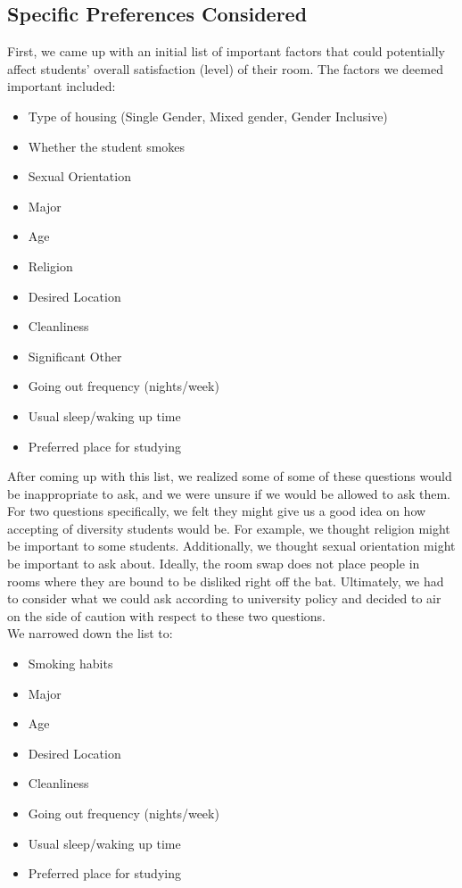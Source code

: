 \documentclass[12pt]{article}
\begin{document}
\subsection{Specific Preferences Considered}
First, we came up with an initial list of important factors that could potentially affect students' overall satisfaction (level) of their room. The factors we deemed important included: 
\begin{itemize}[noitemsep]

\item Type of housing (Single Gender, Mixed gender, Gender Inclusive)
\item Whether the student smokes
\item Sexual Orientation
\item Major 
\item Age
\item Religion
\item Desired Location
\item Cleanliness
\item Significant Other
\item Going out frequency (nights/week)
\item Usual sleep/waking up time
\item Preferred place for studying
\end{itemize}
After coming up with this list, we realized some of some of these questions would be inappropriate to ask, and we were unsure if we would be allowed to ask them. For two questions specifically, we felt they might give us a good idea on how accepting of diversity students would be. For example, we thought religion might be important to some students. Additionally, we thought sexual orientation might be important to ask about. Ideally, the room swap does not place people in rooms where they are bound to be disliked right off the bat. Ultimately, we had to consider what we could ask according to university policy and decided to air on the side of caution with respect to these two questions. \\

\noindent We narrowed down the list to:
\begin{itemize}[noitemsep]
\item Smoking habits
\item Major 
\item Age
\item Desired Location
\item Cleanliness
\item Going out frequency (nights/week)
\item Usual sleep/waking up time
\item Preferred place for studying
\end{itemize}
\end{document}
